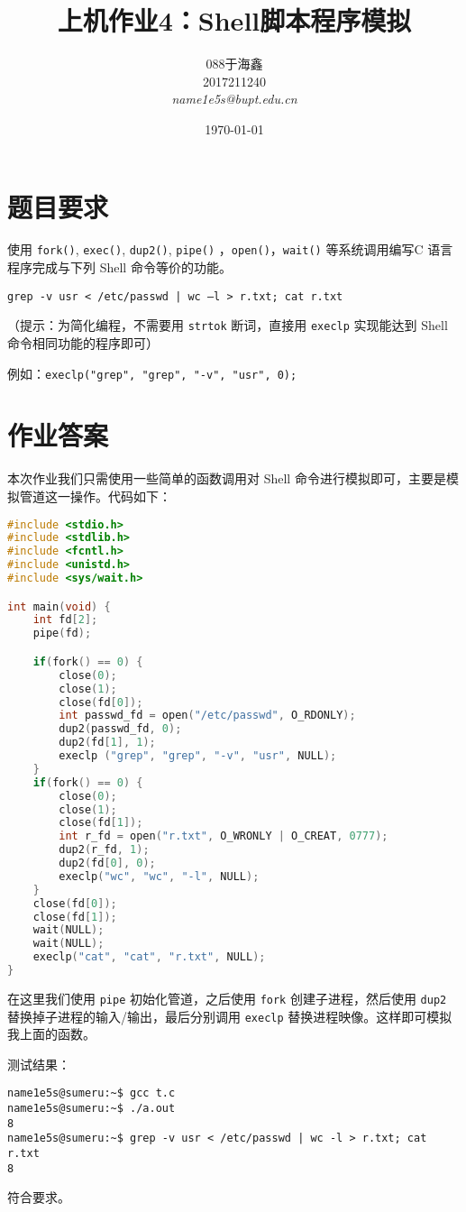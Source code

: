 \documentclass[blue,normal,cn]{elegantnote}
\title{上机作业4：Shell脚本程序模拟}
\date{\today}
\newcommand{\code}[1]{\colorbox{light-gray}{\texttt{#1}}}
\begin{document}
\author{
    \begin{tabular}[t]{c}
        088于海鑫  \\
        2017211240 \\
        \emph{name1e5s@bupt.edu.cn}
    \end{tabular}
}
\maketitle

\section{题目要求}

使用 \code{fork()}, \code{exec()}, \code{dup2()}, \code{pipe()} ，\code{open()}，\code{wait()} 等系统调用编写C 语言程序完成与下列 Shell 命令等价的功能。

\begin{lstlisting}
grep -v usr < /etc/passwd | wc –l > r.txt; cat r.txt
\end{lstlisting}

（提示：为简化编程，不需要用 \code{strtok} 断词，直接用 \code{execlp} 实现能达到 Shell 命令相同功能的程序即可）

例如：\code{execlp("grep", "grep", "-v", "usr", 0);}

\section{作业答案}

本次作业我们只需使用一些简单的函数调用对 Shell 命令进行模拟即可，主要是模拟管道这一操作。代码如下：

\begin{lstlisting}[language=C]
#include <stdio.h>
#include <stdlib.h>
#include <fcntl.h>
#include <unistd.h>
#include <sys/wait.h>

int main(void) {
    int fd[2];
    pipe(fd);

    if(fork() == 0) {
        close(0);
        close(1);
        close(fd[0]);
        int passwd_fd = open("/etc/passwd", O_RDONLY);
        dup2(passwd_fd, 0);
        dup2(fd[1], 1);
        execlp ("grep", "grep", "-v", "usr", NULL);
    }
    if(fork() == 0) {
        close(0);
        close(1);
        close(fd[1]);
        int r_fd = open("r.txt", O_WRONLY | O_CREAT, 0777);
        dup2(r_fd, 1);
        dup2(fd[0], 0);
        execlp("wc", "wc", "-l", NULL);
    }
    close(fd[0]);
    close(fd[1]);
    wait(NULL);
    wait(NULL);
    execlp("cat", "cat", "r.txt", NULL);
}
\end{lstlisting}

在这里我们使用 \code{pipe} 初始化管道，之后使用 \code{fork} 创建子进程，然后使用 \code{dup2} 替换掉子进程的输入/输出，最后分别调用 \code{execlp} 替换进程映像。这样即可模拟我上面的函数。

测试结果：

\begin{lstlisting}
name1e5s@sumeru:~$ gcc t.c
name1e5s@sumeru:~$ ./a.out
8
name1e5s@sumeru:~$ grep -v usr < /etc/passwd | wc -l > r.txt; cat r.txt
8
\end{lstlisting}

符合要求。
\end{document}
